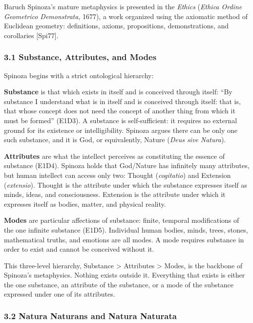 \documentclass[
  11pt,
  letterpaper,
]{article}
\begin{document}
Baruch Spinoza's mature metaphysics is presented in the \emph{Ethics}
(\emph{Ethica Ordine Geometrico Demonstrata}, 1677), a work organized
using the axiomatic method of Euclidean geometry: definitions, axioms,
propositions, demonstrations, and corollaries {[}Spi77{]}.

\subsubsection{3.1 Substance, Attributes, and
Modes}\label{substance-attributes-and-modes}

Spinoza begins with a strict ontological hierarchy:

\textbf{Substance} is that which exists in itself and is conceived
through itself: ``By substance I understand what is in itself and is
conceived through itself: that is, that whose concept does not need the
concept of another thing from which it must be formed'' (E1D3). A
substance is self-sufficient: it requires no external ground for its
existence or intelligibility. Spinoza argues there can be only one such
substance, and it is God, or equivalently, Nature (\emph{Deus sive
Natura}).

\textbf{Attributes} are what the intellect perceives as constituting the
essence of substance (E1D4). Spinoza holds that God/Nature has
infinitely many attributes, but human intellect can access only two:
Thought (\emph{cogitatio}) and Extension (\emph{extensio}). Thought is
the attribute under which the substance expresses itself as minds,
ideas, and consciousness. Extension is the attribute under which it
expresses itself as bodies, matter, and physical reality.

\textbf{Modes} are particular affections of substance: finite, temporal
modifications of the one infinite substance (E1D5). Individual human
bodies, minds, trees, stones, mathematical truths, and emotions are all
modes. A mode requires substance in order to exist and cannot be
conceived without it.

This three-level hierarchy, Substance \textgreater{} Attributes
\textgreater{} Modes, is the backbone of Spinoza's metaphysics. Nothing
exists outside it. Everything that exists is either the one substance,
an attribute of the substance, or a mode of the substance expressed
under one of its attributes.

\subsubsection{3.2 Natura Naturans and Natura
Naturata}\label{natura-naturans-and-natura-naturata}
\end{document}
